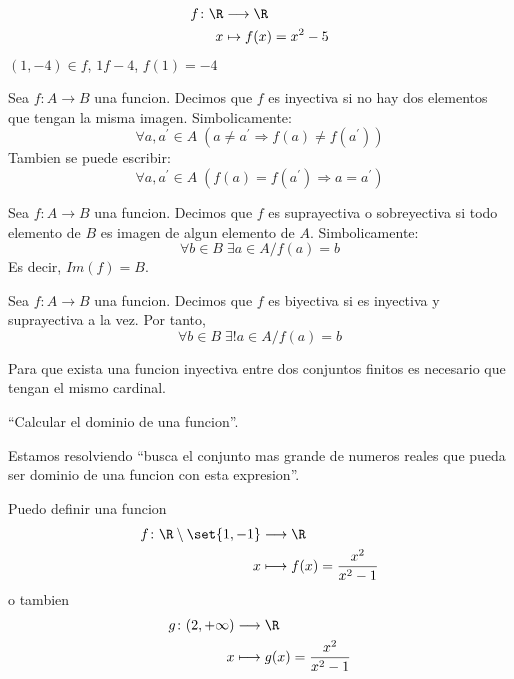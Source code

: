 \begin{example}
	~
	\[
		\begin{aligned}
			f \colon \R & \longrightarrow \R       \\
			x           & \mapsto f (x ) = x^{2}-5
		\end{aligned}
	\]
	\((1,-4) \in f \), \(1f-4 \), \(f(1) = -4\)
\end{example}

\begin{definition}
	Sea \(f \colon A \to B \) una funcion. Decimos que \(f \) es inyectiva si no hay dos elementos que tengan la misma imagen. Simbolicamente:
	\[
		\forall a, a^\prime \in A \; (a \neq a^\prime \Rightarrow f(a) \neq  f(a^\prime ))
	\]
	Tambien se puede escribir:
	\[
		\forall a, a^\prime \in A \; (f(a) = f(a^\prime )\Rightarrow a = a^\prime )
	\]
\end{definition}

\begin{definition}
	Sea \(f \colon A \to B \) una funcion. Decimos que \(f \) es suprayectiva o sobreyectiva si todo elemento de \(B \) es imagen de algun elemento de \(A \). Simbolicamente:
	\[
		\forall b \in B \; \exists a \in A / f(a) = b
	\]
	Es decir, \(Im(f) = B \).
\end{definition}

\begin{definition}
	Sea \(f \colon A \to B \) una funcion. Decimos que \(f \) es biyectiva si es inyectiva y suprayectiva a la vez. Por tanto,
	\[
		\forall b \in B \; \exists! a \in A / f(a) = b
	\]
\end{definition}

\begin{remark}
	Para que exista una funcion inyectiva entre dos conjuntos finitos es necesario que tengan el mismo cardinal.
\end{remark}

\begin{remark}
	``Calcular el dominio de una funcion''.

	Estamos resolviendo ``busca el conjunto mas grande de numeros reales que pueda ser dominio de una funcion con esta expresion''.

	Puedo definir una funcion
	\[
		\begin{aligned}
			f \colon \R \setminus \set{1,-1} & \longrightarrow \R                            \\
			x                                & \longmapsto f (x ) = \frac{x^{2 } }{x^{2} -1}
		\end{aligned}
	\]
	o tambien
	\[
		\begin{aligned}
			g \colon (2,+\infty ) & \longrightarrow \R                           \\
			x                     & \longmapsto g (x ) = \frac{x^{2} }{x^{2} -1}
		\end{aligned}
	\]
\end{remark}

